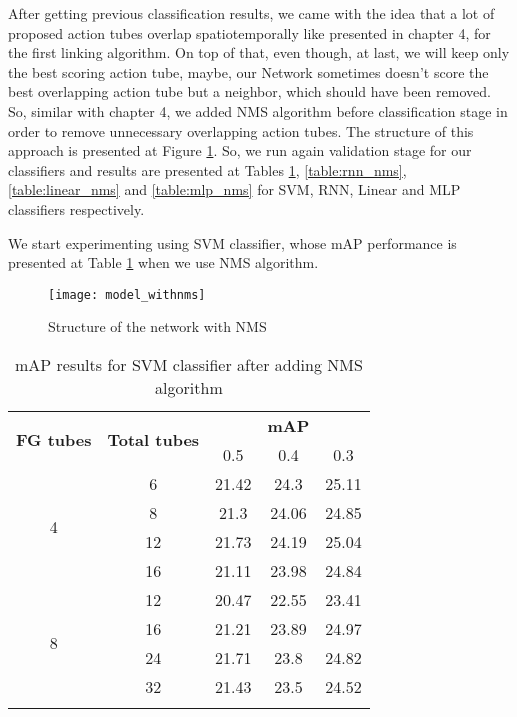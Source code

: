 After getting previous classification results, we came with the idea that a lot of proposed action tubes overlap spatiotemporally like presented in chapter 4,
for the first linking algorithm. On top of that, even though, at last, we will keep only the best scoring action tube, maybe, our Network sometimes
doesn't score the best overlapping action tube but a neighbor, which should have been removed. So, similar with chapter 4, we added NMS algorithm
before classification stage in order to remove unnecessary overlapping action tubes.
The structure of this approach is presented at Figure \ref{fig:network_nms}. So, we run again validation stage for our classifiers
and results are presented at Tables \ref{table:svm_nms}, \ref{table:rnn_nms}, \ref{table:linear_nms} and \ref{table:mlp_nms} for SVM, RNN, Linear
and MLP classifiers respectively. \par

We start experimenting using SVM classifier, whose mAP performance is presented at Table \ref{table:svm_nms} when we use NMS algorithm.

\begin{figure}[h]
  \centering
  \texttt{[image: model\_withnms]}
  \caption{Structure of the network with NMS}
  \label{fig:network_nms}
\end{figure}

\begin{center}
  \begin{longtable}{|| c | c || c c c ||}
    \hline
    \multirow{2}{*}{\textbf{FG tubes}} & \multirow{2}{*}{\textbf{Total tubes}} & {} & \textbf{mAP} & {} \\
    {} & {} & 0.5 & 0.4 & 0.3 \\
    \hline
    \multirow{4}{*}{4} & 6 & 21.42 & 24.3 & 25.11 \\
    \cline{2-5}
    {} & 8 & 21.3 & 24.06 & 24.85 \\
    \cline{2-5}
    {} & 12 & 21.73 & 24.19 & 25.04 \\
    \cline{2-5}
    {} & 16 & 21.11 & 23.98 & 24.84 \\
    \hline
    \multirow{4}{*}{8} & 12 & 20.47 & 22.55 & 23.41 \\
    \cline{2-5}
    {} & 16 & 21.21 & 23.89 & 24.97 \\
    \cline{2-5}
    {} & 24 & 21.71 & 23.8 & 24.82 \\
    \cline{2-5}
    {} & 32 & 21.43 & 23.5 & 24.52 \\
    \hline

  \caption{mAP results for SVM classifier after adding NMS algorithm}
  \label{table:svm_nms}
\end{longtable}
\end{center}

